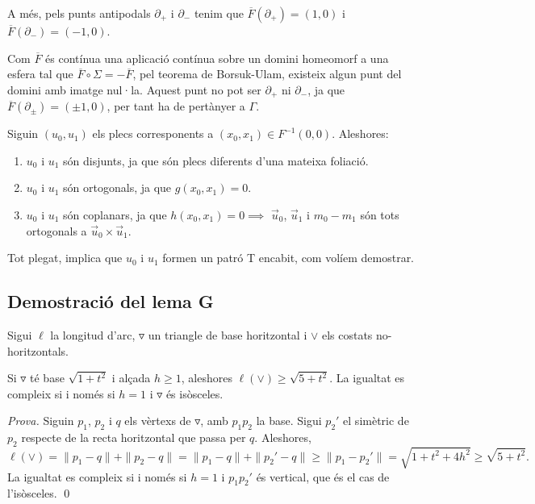 A més, pels punts antipodals $\partial_+$ i $\partial_-$ tenim que $\overline{F}(\partial_+) = (1,0)$ i $\overline{F}(\partial_-) = (-1,0)$.

Com $\overline{F}$ és contínua una aplicació contínua sobre un domini homeomorf a una esfera tal que $\overline{F}\circ\Sigma = -\overline{F}$, pel teorema de Borsuk-Ulam, existeix algun punt del domini amb imatge nul·la. Aquest punt no pot ser $\partial_+$ ni $\partial_-$, ja que $\overline{F}(\partial_\pm) = (\pm1,0)$, per tant ha de pertànyer a $\Gamma$.

Siguin $(u_0,u_1)$ els plecs corresponents a $(x_0,x_1)\in F^{-1}(0,0)$.
Aleshores:
\begin{enumerate}
    \item $u_0$ i $u_1$ són disjunts, ja que són plecs diferents d'una mateixa foliació.
    \item $u_0$ i $u_1$ són ortogonals, ja que $g(x_0,x_1) = 0$.
    \item $u_0$ i $u_1$ són coplanars, ja que $h(x_0,x_1) = 0\implies$ $\vec u_0$, $\vec u_1$ i $m_0-m_1$ són tots ortogonals a $\vec u_0\times\vec u_1$.
\end{enumerate}

Tot plegat, implica que $u_0$ i $u_1$ formen un patró T encabit, com volíem demostrar.

\subsection{Demostració del lema G}
\begin{nota}
    Sigui $\ell$ la longitud d'arc, $\triangledown$ un triangle de base horitzontal i $\lor$ els costats no-horitzontals.
\end{nota}

\begin{defi}
    Si $\triangledown$ té base $\sqrt{1+t^2}$ i alçada $h\ge1$, aleshores $\ell(\lor)\ge\sqrt{5+t^2}$. La igualtat es compleix si i només si $h=1$ i $\triangledown$ és isòsceles.
\end{defi}

{
    \color{green!50!black}
    \textit{Prova.}
    Siguin $p_1$, $p_2$ i $q$ els vèrtexs de $\triangledown$, amb $p_1p_2$ la base. Sigui $p_2'$ el simètric de $p_2$ respecte de la recta horitzontal que passa per $q$. Aleshores,
    \begin{equation*}
        \ell(\lor) = \|p_1-q\| + \|p_2-q\| = \|p_1-q\| + \|p_2'-q\| \ge \|p_1-p_2'\| = \sqrt{1+t^2+4h^2}\ge\sqrt{5+t^2}.
    \end{equation*}
    La igualtat es compleix si i només si $h=1$ i $p_1p_2'$ és vertical, que és el cas de l'isòsceles.
    \qed
}

